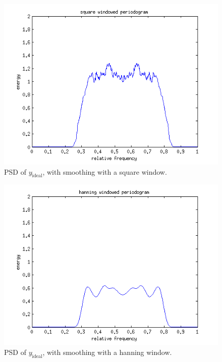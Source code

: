 \documentclass[10pt]{article}
\begin{document}
\begin{figure}[!hp]

    \begin{center}
      \includegraphics[width=1\textwidth]{ideal_periodogram_square}
    \caption{PSD of $y_\text{ideal}$, with smoothing with a square window. \label{fig:TheoACFsimple}}
    \end{center}

\end{figure}

\begin{figure}[!hp]

    \begin{center}
      \includegraphics[width=1\textwidth]{ideal_periodogram_hanning}
    \caption{PSD of $y_\text{ideal}$, with smoothing with a hanning window. \label{fig:TheoACFsimple}}
    \end{center}

\end{figure}
\end{document}
